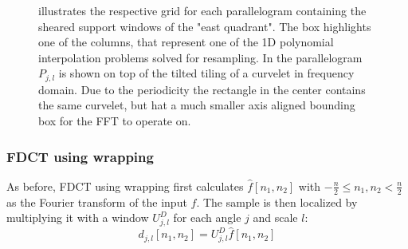 \begin{figure}[h]
    \centering
    \quad
    \caption[Frequency tilings for USFFT and wrapping]{
         illustrates the respective grid for
        each parallelogram containing the sheared support windows of the "east
        quadrant". The box highlights one of the columns, that represent one of
        the 1D polynomial interpolation problems solved for resampling.
        In  the parallelogram $P_{j ,l}$
        is shown on top of the tilted tiling of a curvelet in frequency domain.
        Due to the periodicity the rectangle in the center contains the same
        curvelet, but hat a much smaller axis aligned bounding box for the FFT
        to operate on.
    }
    \label{fig:curvelet_discrete_tilings}
\end{figure}

\subsubsection{FDCT using wrapping}

As before, FDCT using wrapping first calculates $\hat{f}[n_1, n_2]$ with
$-\frac{n}{2} \leq n_1, n_2 < \frac{n}{2}$ as the Fourier transform of the
input $f$. The sample is then localized by multiplying it with a window $U_{j,
l}^D$ for each angle $j$ and scale $l$:
\begin{equation*}
    d_{j, l}[n_1, n_2] = U_{j, l}^D \hat{f}[n_1, n_2]
\end{equation*}


